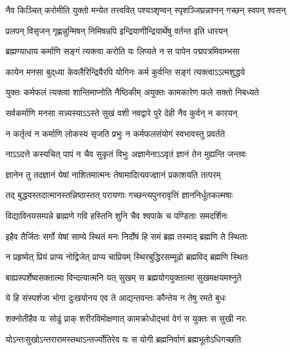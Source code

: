 \twolineshloka
{नैव किञ्चित् करोमीति युक्तो मन्येत तत्त्ववित्}
{पश्यञ्शृण्वन् स्पृशञ्जिघ्र{\mbox{}न्न}श्नन् गच्छन् स्वपन् श्वसन्}%

\twolineshloka
{प्रलपन् विसृजन् गृह्णन्नुन्मिषन् निमिषन्नपि}
{इन्द्रियाणीन्द्रियार्थेषु वर्तन्त इति धारयन्}%

\twolineshloka
{ब्रह्मण्याधाय कर्माणि सङ्गं त्यक्त्वा करोति यः}
{लिप्यते न स पापेन पद्मपत्रमिवाम्भसा}%

\twolineshloka
{कायेन मनसा बुद्‌ध्या केवलैरिन्द्रियैरपि}
{योगिनः कर्म कुर्वन्ति सङ्गं त्यक्त्वाऽऽत्मशुद्धये}%

\twolineshloka
{युक्तः कर्मफलं त्यक्त्वा शान्तिमाप्नोति नैष्ठिकीम्}
{अयुक्तः कामकारेण फले सक्तो निबध्यते}%

\twolineshloka
{सर्वकर्माणि मनसा सन्न्यस्याऽऽस्ते सुखं वशी}
{नवद्वारे पुरे देही नैव कुर्वन् न कारयन्}%

\twolineshloka
{न कर्तृत्वं न कर्माणि लोकस्य सृजति प्रभुः}
{न कर्मफलसंयोगं स्वभावस्तु प्रवर्तते}%

\twolineshloka
{नाऽऽदत्ते कस्यचित् पापं न चैव सुकृतं विभुः}
{अज्ञानेनाऽऽवृतं ज्ञानं तेन मुह्यन्ति जन्तवः}%

\twolineshloka
{ज्ञानेन तु तदज्ञानं येषां नाशितमात्मनः}
{तेषामादित्यवज्ज्ञानं प्रकाशयति तत्परम्}%

\twolineshloka
{तद् बुद्धयस्तदात्मानस्तन्निष्ठास्तत् परायणाः}
{गच्छन्त्यपुनरावृत्तिं ज्ञाननिर्धूतकल्मषाः}%

\twolineshloka
{विद्याविनयसम्पन्ने ब्राह्मणे गवि हस्तिनि}
{शुनि चैव श्वपाके च पण्डिताः समदर्शिनः}%

\twolineshloka
{इहैव तैर्जितः सर्गो येषां साम्ये स्थितं मनः}
{निर्दोषं हि समं ब्रह्म तस्माद् ब्रह्मणि ते स्थिताः}%

\twolineshloka
{न प्रहृष्येत् प्रियं प्राप्य नोद्विजेत् प्राप्य चाप्रियम्}
{स्थिरबुद्धिरसम्मूढो ब्रह्मविद् ब्रह्मणि स्थितः}%

\twolineshloka
{बाह्यस्पर्शेष्वसक्तात्मा विन्दत्यात्मनि यत् सुखम्}
{स ब्रह्मयोगयुक्तात्मा सुखमक्षयमश्नुते}%

\twolineshloka
{ये हि संस्पर्शजा भोगा दुःखयोनय एव ते}
{आद्यन्तवन्तः कौन्तेय न तेषु रमते बुधः}%

\twolineshloka
{शक्नोतीहैव यः सोढुं प्राक् शरीरविमोक्षणात्}
{कामक्रोधोद्भवं वेगं स युक्तः स सुखी नरः}%

\twolineshloka
{योऽन्तःसुखोऽन्तरारामस्तथाऽन्तर्ज्योतिरेव यः}
{स योगी ब्रह्मनिर्वाणं ब्रह्मभूतोऽधिगच्छति}%

